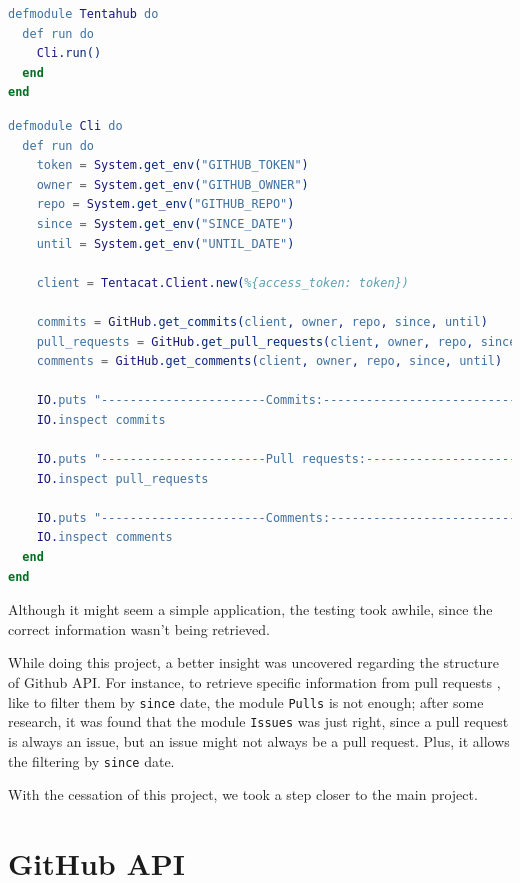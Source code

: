\begin{lstlisting}[language=Erlang, caption={Setup of tentahub.ex}]
    defmodule Tentahub do
  def run do
    Cli.run()
  end
end
\end{lstlisting}


\begin{lstlisting}[language=Erlang, caption={Configuration of cli.ex}]
    defmodule Cli do
  def run do
    token = System.get_env("GITHUB_TOKEN")
    owner = System.get_env("GITHUB_OWNER")
    repo = System.get_env("GITHUB_REPO")
    since = System.get_env("SINCE_DATE")
    until = System.get_env("UNTIL_DATE")

    client = Tentacat.Client.new(%{access_token: token})

    commits = GitHub.get_commits(client, owner, repo, since, until)
    pull_requests = GitHub.get_pull_requests(client, owner, repo, since, until)
    comments = GitHub.get_comments(client, owner, repo, since, until)

    IO.puts "-----------------------Commits:------------------------------"
    IO.inspect commits

    IO.puts "-----------------------Pull requests:------------------------"
    IO.inspect pull_requests

    IO.puts "-----------------------Comments:-----------------------------"
    IO.inspect comments
  end
end
\end{lstlisting}

Although it might seem a simple application, the testing took awhile, since the correct information wasn't being retrieved.\newline

While doing this project, a better insight was uncovered regarding the structure of Github API. For instance, to retrieve specific information from pull requests \label{issue}, like to filter them by \texttt{since} date, the module \texttt{Pulls} is not enough; after some research, it was found that the module \texttt{Issues} was just right, since a pull request is always an issue, but an issue might not always be a pull request. Plus, it allows the filtering by \texttt{since} date.\newline

With the cessation of this project, we took a step closer to the main project.


\section{GitHub API} \label{github}

